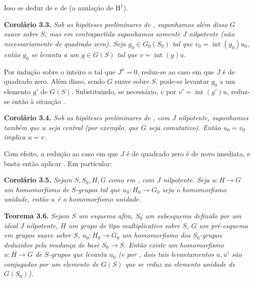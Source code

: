 Isso se deduz de
 e de
 (a anulação de
\(\mathrm H^1\)).

\medskip
\noindent{}\textbf{Corolário 3.3.}
\textit{Sob as hipóteses preliminares de
, suponhamos além disso \(G\)
suave sobre \(S\), mas em contrapartida suponhamos somente \(J\)
nilpotente (não necessariamente de quadrado zero). Seja
\(g_0\in G_0(S_0)\) tal que \(v_0=\operatorname{int}(g_0)u_0\),
então \(g_0\) se levanta a um \(g\in G(S)\) tal que
\(v=\operatorname{int}(g)u\).}

Por indução sobre o inteiro \(n\) tal que \(J^n=0\), reduz-se ao
caso em que \(J\) é de quadrado zero. Além disso, sendo \(G\) suave
sobre \(S\), pode-se levantar \(g_0\) a um elemento \(g'\) de
\(G(S)\). Substituindo, se necessário, \(v\) por
\(v'=\operatorname{int}(g')u\), reduz-se então à situação
.

\medskip
\noindent{}\textbf{Corolário 3.4.}
\textit{Sob as hipóteses preliminares de
, com \(J\) nilpotente, suponhamos
também que \(u\) seja central (por exemplo, que \(G\) seja comutativo).
Então \(u_0=v_0\) implica \(u=v\).}

Com efeito, a redução ao caso em que \(J\) é de quadrado zero é de
novo imediata, e basta então aplicar
. Em particular:

\medskip
\noindent{}\textbf{Corolário 3.5.}
\textit{Sejam \(S,S_0,H,G\) como em
, com \(J\) nilpotente. Seja
\(u:H\to G\) um homomorfismo de \(S\)-grupos tal que
\(u_0:H_0\to G_0\) seja o homomorfismo unidade, então \(u\) é o
homomorfismo unidade.}

\medskip
\noindent{}\textbf{Teorema 3.6.}
\textit{Sejam \(S\) um esquema afim, \(S_0\) um subesquema definido
por um ideal \(J\) nilpotente, \(H\) um grupo de tipo multiplicativo
sobre \(S\), \(G\) um pré-esquema em grupos suave sobre \(S\),
\(u_0:H_0\to G_0\) um homomorfismo dos \(S_0\)-grupos deduzidos
pela mudança de base \(S_0\to S\). Então existe um homomorfismo
\(u:H\to G\) de \(S\)-grupos que levanta \(u_0\) (e por
, dois tais levantamentos
\(u,u'\) são conjugados por um elemento de \(G(S)\) que se reduz
ao elemento unidade de \(G(S_0)\)).}


